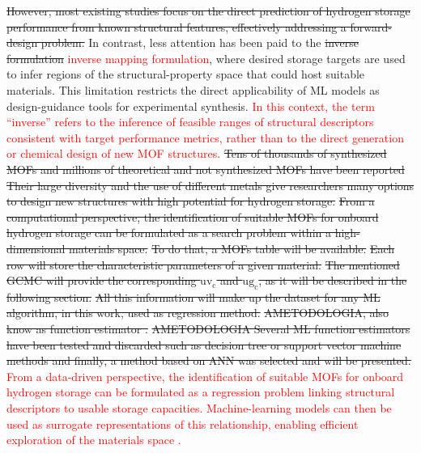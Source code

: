 \documentclass[review]{elsarticle}
\newcommand{\ugc}{\mathrm{ug_c}}
\newcommand{\uvc}{\mathrm{uv_c}}
\begin{document}
\sout{However, most existing studies focus on the direct prediction of hydrogen 
storage performance from known structural features, effectively addressing a 
forward-design problem.} In contrast, less attention has been paid to the 
\sout{inverse formulation} \textcolor{red}{inverse mapping formulation}, where 
desired storage targets are used to infer regions of the structural-property 
space that could host suitable materials. This limitation restricts the direct 
applicability of ML models as design-guidance tools for experimental synthesis. 
\textcolor{red}{In this context, the term ``inverse'' refers to the inference 
of feasible ranges of structural descriptors consistent with target performance 
metrics, rather than to the direct generation or chemical design of new MOF 
structures.}
\sout{Tens of thousands of synthesized MOFs and millions of theoretical and not synthesized MOFs have been reported} %
\sout{Their large diversity and the use of different metals give researchers many options to design new structures with high potential for hydrogen storage.}
\sout{From a computational perspective, the identification of suitable MOFs for onboard hydrogen storage can be formulated as a search problem within a high-dimensional materials space.}
\sout{To do that, a MOFs table will be available.}
\sout{Each row will store the characteristic parameters of a given material.}
\sout{The mentioned GCMC will provide the corresponding $\uvc$ and $\ugc$, as it will be described in the following section.}
\sout{All this information will make up the dataset for any ML algorithm, in this work, used as regression method.}
\sout{AMETODOLOGIA, also know as function estimator \cite{geron2019}.}
\sout{AMETODOLOGIA Several ML function estimators have been tested and discarded such as decision tree or support vector machine methods and finally, a method based on ANN was selected and will be presented.} \textcolor{red}{
From a data-driven perspective, the identification of suitable MOFs for onboard 
hydrogen storage can be formulated as a regression problem linking structural 
descriptors to usable storage capacities. Machine-learning models can then be 
used as surrogate representations of this relationship, enabling efficient 
exploration of the materials space \cite{pkkl+24}.
}
\end{document}
